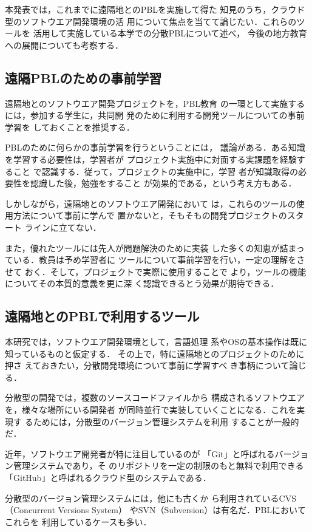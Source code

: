 \documentclass[a4j, 12Q, twocolumn, twoside]{jsarticle}
\begin{document}
本発表では，これまでに遠隔地とのPBLを実施して得た
知見のうち，クラウド型のソフトウエア開発環境の活
用について焦点を当てて論じたい．これらのツールを
活用して実施している本学での分散PBLについて述べ，
今後の地方教育への展開についても考察する．

\subsection{遠隔PBLのための事前学習}

遠隔地とのソフトウエア開発プロジェクトを，PBL教育
の一環として実施するには，参加する学生に，共同開
発のために利用する開発ツールについての事前学習を
しておくことを推奨する．

PBLのために何らかの事前学習を行うということには，
議論がある．ある知識を学習する必要性は，学習者が
プロジェクト実施中に対面する実課題を経験すること
で認識する．従って，プロジェクトの実施中に，学習
者が知識取得の必要性を認識した後，勉強をすること
が効果的である，という考え方もある．

しかしながら，遠隔地とのソフトウエア開発において
は，これらのツールの使用方法について事前に学んで
置かないと，そもそもの開発プロジェクトのスタート
ラインに立てない．

また，優れたツールには先人が問題解決のために実装
した多くの知恵が詰まっている．教員は予め学習者に
ツールについて事前学習を行い，一定の理解をさせて
おく．そして，プロジェクトで実際に使用することで
より，ツールの機能についてその本質的意義を更に深
く認識できるとう効果が期待できる．

\subsection{遠隔地とのPBLで利用するツール}
本研究では，ソフトウエア開発環境として，言語処理
系やOSの基本操作は既に知っているものと仮定する．
その上で，特に遠隔地とのプロジェクトのために押さ
えておきたい，分散開発環境について事前に学習すべ
き事柄について論じる．

分散型の開発では，複数のソースコードファイルから
構成されるソフトウエアを，様々な場所にいる開発者
が同時並行で実装していくことになる．これを実現す
るためには，分散型のバージョン管理システムを利用
することが一般的だ．

近年，ソフトウエア開発者が特に注目しているのが
「Git」と呼ばれるバージョン管理システムであり，そ
のリポジトリを一定の制限のもと無料で利用できる
「GitHub」と呼ばれるクラウド型のシステムである．

分散型のバージョン管理システムには，他にも古くか
ら利用されているCVS（Concurrent Versions System）
やSVN（Subversion）は有名だ．PBLにおいてこれらを
利用しているケースも多い．
\end{document}
